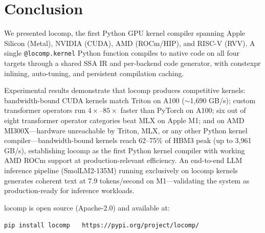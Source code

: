 \documentclass[10pt,twocolumn]{article}
\begin{document}
\section{Conclusion}
\label{sec:conclusion}

We presented locomp, the first Python GPU kernel compiler spanning Apple
Silicon (Metal), NVIDIA (CUDA), AMD (ROCm/HIP), and RISC-V (RVV). A single
\texttt{@locomp.kernel} Python function compiles to native code on all four
targets through a shared SSA IR and per-backend code generator, with
constexpr inlining, auto-tuning, and persistent compilation caching.

Experimental results demonstrate that locomp produces competitive kernels:
bandwidth-bound CUDA kernels match Triton on A100 (${\sim}$1,690 GB/s); custom
transformer operators run $4\times$--$85\times$ faster than PyTorch on A100;
six out of eight transformer operator categories beat MLX on Apple M1;
and on AMD MI300X---hardware unreachable by Triton, MLX, or any other Python
kernel compiler---bandwidth-bound kernels reach 62--75\% of HBM3 peak
(up to 3,961 GB/s), establishing locomp as the first Python kernel compiler
with working AMD ROCm support at production-relevant efficiency.
An end-to-end LLM inference pipeline (SmolLM2-135M) running exclusively on
locomp kernels generates coherent text at 7.9 tokens/second on M1---validating
the system as production-ready for inference workloads.

locomp is open source (Apache-2.0) and available at:

\begin{center}
\texttt{pip install locomp} $\quad$ \texttt{https://pypi.org/project/locomp/}
\end{center}
\end{document}
